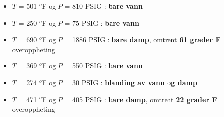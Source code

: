 





\begin{itemize}
\item{} $T$ = 501 $^{o}$F og $P$ = 810 PSIG : {\bf bare vann}
\item{} $T$ = 250 $^{o}$F og $P$ = 75 PSIG : {\bf bare vann}
\item{} $T$ = 690 $^{o}$F og $P$ = 1886 PSIG : {\bf bare damp}, omtrent {\bf 61 grader F} overoppheting
\item{} $T$ = 369 $^{o}$F og $P$ = 550 PSIG : {\bf bare vann}
\item{} $T$ = 274 $^{o}$F og $P$ = 30 PSIG  : {\bf blanding av vann og damp}
\item{} $T$ = 471 $^{o}$F og $P$ = 405 PSIG : {\bf bare damp}, omtrent {\bf 22 grader F} overoppheting
\end{itemize}



